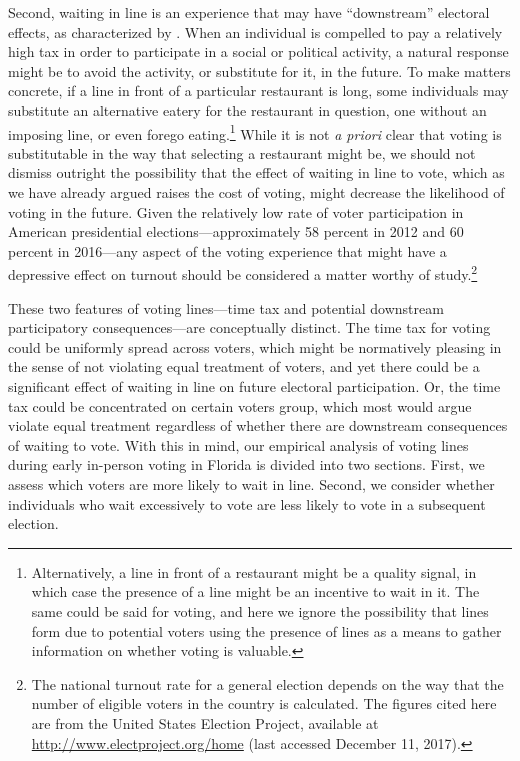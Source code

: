 \documentclass[12pt,titlepage]{article}
\begin{document}
Second, waiting in line is an experience that may have ``downstream''
electoral effects, as characterized by
\citet{pettigrew:longlinesminorityprecincts}. When an individual is
compelled to pay a relatively high tax in order to participate in a
social or political activity, a natural response might be to avoid the
activity, or substitute for it, in the future. To make matters
concrete, if a line in front of a particular restaurant is long, some
individuals may substitute an alternative eatery for the restaurant in
question, one without an imposing line, or even forego
eating.\footnote{Alternatively, a line in front of a restaurant might
  be a quality signal, in which case the presence of a line might be
  an incentive to wait in it.  The same could be said for voting, and
  here we ignore the possibility that lines form due to potential
  voters using the presence of lines as a means to gather information
  on whether voting is valuable.}  While it is not \emph{a priori}
clear that voting is substitutable in the way that selecting a
restaurant might be, we should not dismiss outright the possibility
that the effect of waiting in line to vote, which as we have already
argued raises the cost of voting, might decrease the likelihood of
voting in the future.  Given the relatively low rate of voter
participation in American presidential elections---approximately 58
percent in 2012 and 60 percent in 2016---any aspect of the voting
experience that might have a depressive effect on turnout should be
considered a matter worthy of study.\footnote{The national turnout
  rate for a general election depends on the way that the number of
  eligible voters in the country is calculated.  The figures cited
  here are from the United States Election Project, available at
  \url{http://www.electproject.org/home} (last accessed December 11,
  2017).\label{fn:uselectionproject}}

These two features of voting lines---time tax and potential downstream
participatory consequences---are conceptually distinct. The time tax
for voting could be uniformly spread across voters, which might be
normatively pleasing in the sense of not violating equal treatment of
voters, and yet there could be a significant effect of waiting in line
on future electoral participation. Or, the time tax could be
concentrated on certain voters group, which most would argue violate
equal treatment regardless of whether there are downstream
consequences of waiting to vote. With this in mind, our empirical
analysis of voting lines during early in-person voting in Florida is
divided into two sections. First, we assess which voters are more
likely to wait in line. Second, we consider whether individuals who
wait excessively to vote are less likely to vote in a subsequent
election.
\end{document}
